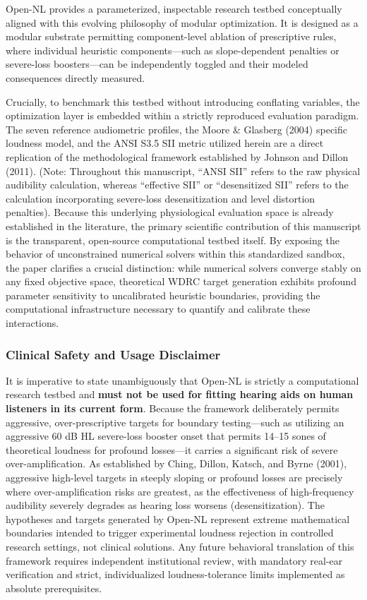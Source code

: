 \documentclass[
  12pt,
]{article}
\begin{document}
Open-NL provides a parameterized, inspectable research testbed
conceptually aligned with this evolving philosophy of modular
optimization. It is designed as a modular substrate permitting
component-level ablation of prescriptive rules, where individual
heuristic components---such as slope-dependent penalties or severe-loss
boosters---can be independently toggled and their modeled consequences
directly measured.

Crucially, to benchmark this testbed without introducing conflating
variables, the optimization layer is embedded within a strictly
reproduced evaluation paradigm. The seven reference audiometric
profiles, the Moore \& Glasberg (2004) specific loudness model, and the
ANSI S3.5 SII metric utilized herein are a direct replication of the
methodological framework established by Johnson and Dillon (2011).
(Note: Throughout this manuscript, ``ANSI SII'' refers to the raw
physical audibility calculation, whereas ``effective SII'' or
``desensitized SII'' refers to the calculation incorporating severe-loss
desensitization and level distortion penalties). Because this underlying
physiological evaluation space is already established in the literature,
the primary scientific contribution of this manuscript is the
transparent, open-source computational testbed itself. By exposing the
behavior of unconstrained numerical solvers within this standardized
sandbox, the paper clarifies a crucial distinction: while numerical
solvers converge stably on any fixed objective space, theoretical WDRC
target generation exhibits profound parameter sensitivity to
uncalibrated heuristic boundaries, providing the computational
infrastructure necessary to quantify and calibrate these interactions.

\subsubsection{Clinical Safety and Usage
Disclaimer}\label{clinical-safety-and-usage-disclaimer}

It is imperative to state unambiguously that Open-NL is strictly a
computational research testbed and \textbf{must not be used for fitting
hearing aids on human listeners in its current form}. Because the
framework deliberately permits aggressive, over-prescriptive targets for
boundary testing---such as utilizing an aggressive 60 dB HL severe-loss
booster onset that permits 14--15 sones of theoretical loudness for
profound losses---it carries a significant risk of severe
over-amplification. As established by Ching, Dillon, Katsch, and Byrne
(2001), aggressive high-level targets in steeply sloping or profound
losses are precisely where over-amplification risks are greatest, as the
effectiveness of high-frequency audibility severely degrades as hearing
loss worsens (desensitization). The hypotheses and targets generated by
Open-NL represent extreme mathematical boundaries intended to trigger
experimental loudness rejection in controlled research settings, not
clinical solutions. Any future behavioral translation of this framework
requires independent institutional review, with mandatory real-ear
verification and strict, individualized loudness-tolerance limits
implemented as absolute prerequisites.
\end{document}
